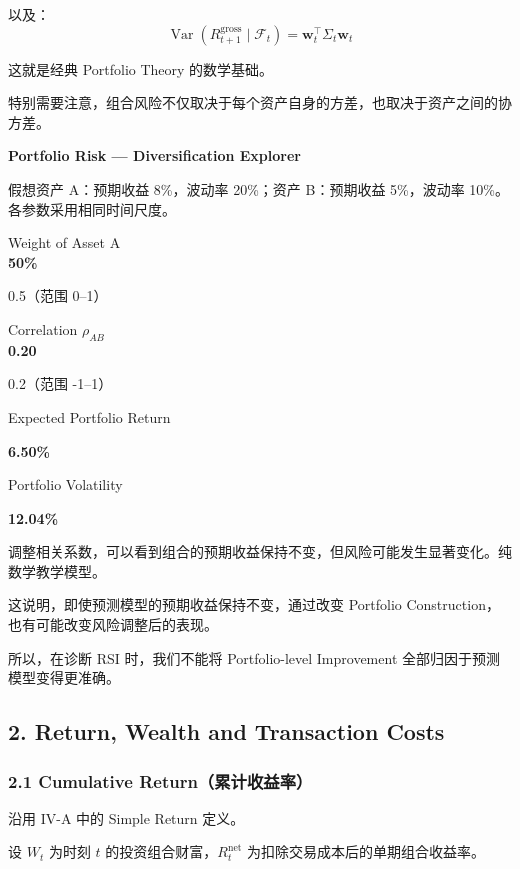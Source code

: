 以及：
\[\boxed{
\operatorname{Var}(R_{t+1}^{\mathrm{gross}}\mid\mathcal F_t)
=
\boldsymbol w_t^\top\Sigma_t\boldsymbol w_t
}\]

这就是经典 Portfolio Theory 的数学基础。

特别需要注意，组合风险不仅取决于每个资产自身的方差，也取决于资产之间的协方差。

\textbf{Portfolio Risk --- Diversification Explorer}

假想资产 A：预期收益 8\%，波动率 20\%；资产 B：预期收益 5\%，波动率 10\%。各参数采用相同时间尺度。

Weight of Asset A\\
\textbf{50\%}

0.5（范围 0--1）

Correlation \(\rho_{AB}\)\\
\textbf{0.20}

0.2（范围 -1--1）

Expected Portfolio Return

\textbf{6.50\%}

Portfolio Volatility

\textbf{12.04\%}

调整相关系数，可以看到组合的预期收益保持不变，但风险可能发生显著变化。纯数学教学模型。

这说明，即使预测模型的预期收益保持不变，通过改变 Portfolio Construction，也有可能改变风险调整后的表现。

所以，在诊断 RSI 时，我们不能将 Portfolio-level Improvement 全部归因于预测模型变得更准确。

\hypertarget{part-4-67-0001-return-wealth-and-transaction-costs}{%
\subsection{2. Return, Wealth and Transaction Costs}\label{part-4-67-0001-return-wealth-and-transaction-costs}}

\hypertarget{part-4-67-0001-cumulative-returnux7d2fux8ba1ux6536ux76caux7387}{%
\subsubsection{2.1 Cumulative Return（累计收益率）}\label{part-4-67-0001-cumulative-returnux7d2fux8ba1ux6536ux76caux7387}}

沿用 IV-A 中的 Simple Return 定义。

设 \(W_t\) 为时刻 \(t\) 的投资组合财富，\(R_t^{\mathrm{net}}\) 为扣除交易成本后的单期组合收益率。


